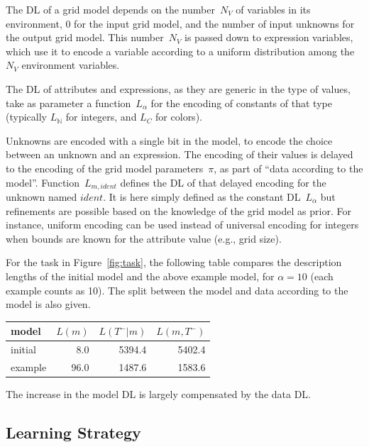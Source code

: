 \documentclass[a4paper]{llncs}
\newcommand{\nat}{\mathbb{N}}
\begin{document}
The DL of a grid model depends on the number~$N_V$ of variables in its
environment, 0 for the input grid model, and the number of input
unknowns for the output grid model. This number~$N_V$ is passed down
to expression variables, which use it to encode a variable according to a
uniform distribution among the $N_V$ environment variables.

The DL of attributes and expressions, as they are generic in the type
of values, take as parameter a function~$L_\alpha$ for the encoding of
constants of that type (typically $L_\nat$ for integers, and $L_C$ for
colors).

Unknowns are encoded with a single bit in the model, to encode the
choice between an unknown and an expression. The encoding of their
values is delayed to the encoding of the grid model parameters~$\pi$,
as part of ``data according to the model''.  Function~$L_{m,ident}$
defines the DL of that delayed encoding for the unknown named
$ident$. It is here simply defined as the constant DL~$L_\alpha$ but
refinements are possible based on the knowledge of the grid model as
prior. For instance, uniform encoding can be used instead of universal
encoding for integers when bounds are known for the attribute value
(e.g., grid size).

For the task in Figure~\ref{fig:task}, the following table compares
the description lengths of the initial model and the above example
model, for $\alpha=10$ (each example counts as 10). The split between
the model and data according to the model is also given.

\begin{center}
  \begin{tabular}{|l|r|r|r|}
    \hline
    model & $L(m)$ & $L(T^-|m)$ & $L(m,T^-)$ \\
    \hline
    initial & 8.0 & 5394.4 & 5402.4 \\
    example & 96.0 & 1487.6 & 1583.6 \\
    \hline
  \end{tabular}
\end{center}

The increase in the model DL is largely compensated by the data DL.


\subsection{Learning Strategy}
\end{document}
